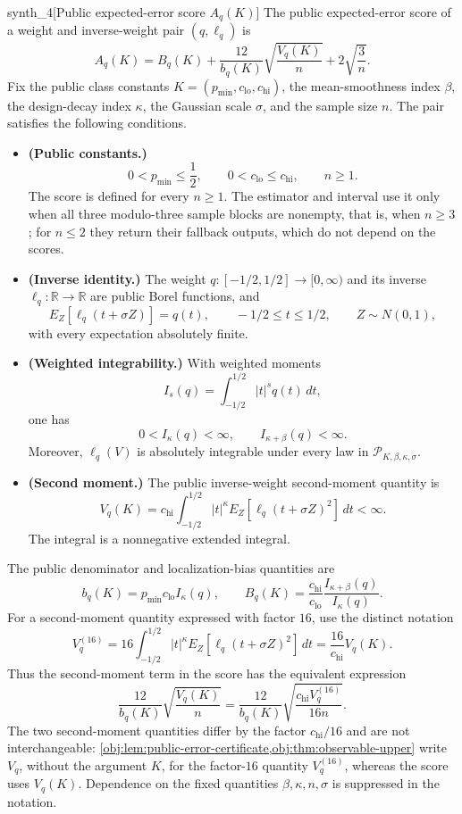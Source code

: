\documentclass[11pt]{article}
\begin{document}
\begin{definitionv}{synth_4}[Public expected-error score \(A_q(K)\)]
The public expected-error score of a weight and inverse-weight pair \((q,\ell_q)\) is
\[
A_q(K)
=
B_q(K)
+\frac{12}{b_q(K)}\sqrt{\frac{V_q(K)}{n}}
+2\sqrt{\frac3n}.
\]
Fix the public class constants \(K=(p_{\min},c_{\mathrm{lo}},c_{\mathrm{hi}})\), the mean-smoothness index \(\beta\), the design-decay index \(\kappa\), the Gaussian scale \(\sigma\), and the sample size \(n\). The pair satisfies the following conditions.
\begin{itemize}
\item \textbf{(Public constants.)}
\[
0<p_{\min}\le\frac12,
\qquad
0<c_{\mathrm{lo}}\le c_{\mathrm{hi}},
\qquad n\ge1.
\]
The score is defined for every \(n\ge1\). The estimator and interval use it only when all three modulo-three sample blocks are nonempty, that is, when \(n\ge3\); for \(n\le2\) they return their fallback outputs, which do not depend on the scores.
\item \textbf{(Inverse identity.)}
The weight \(q:[-1/2,1/2]\to[0,\infty)\) and its inverse \(\ell_q:\mathbb R\to\mathbb R\) are public Borel functions, and
\[
E_Z[\ell_q(t+\sigma Z)]=q(t),
\qquad -1/2\le t\le1/2,
\qquad Z\sim N(0,1),
\]
with every expectation absolutely finite.
\item \textbf{(Weighted integrability.)}
With weighted moments
\[
I_s(q)=\int_{-1/2}^{1/2}|t|^s q(t)\,dt,
\]
one has
\[
0<I_\kappa(q)<\infty,
\qquad
I_{\kappa+\beta}(q)<\infty.
\]
Moreover, \(\ell_q(V)\) is absolutely integrable under every law in \(\mathcal P_{K,\beta,\kappa,\sigma}\).
\item \textbf{(Second moment.)}
The public inverse-weight second-moment quantity is
\[
V_q(K)
=
c_{\mathrm{hi}}\int_{-1/2}^{1/2}
|t|^\kappa E_Z[\ell_q(t+\sigma Z)^2]\,dt
<\infty.
\]
The integral is a nonnegative extended integral.
\end{itemize}
The public denominator and localization-bias quantities are
\[
b_q(K)=p_{\min}c_{\mathrm{lo}}I_\kappa(q),
\qquad
B_q(K)=\frac{c_{\mathrm{hi}}}{c_{\mathrm{lo}}}
\frac{I_{\kappa+\beta}(q)}{I_\kappa(q)}.
\]
For a second-moment quantity expressed with factor \(16\), use the distinct notation
\[
V_q^{(16)}
=
16\int_{-1/2}^{1/2}|t|^\kappa
E_Z[\ell_q(t+\sigma Z)^2]\,dt
=
\frac{16}{c_{\mathrm{hi}}}V_q(K).
\]
Thus the second-moment term in the score has the equivalent expression
\[
\frac{12}{b_q(K)}\sqrt{\frac{V_q(K)}n}
=
\frac{12}{b_q(K)}
\sqrt{\frac{c_{\mathrm{hi}}V_q^{(16)}}{16n}}.
\]
The two second-moment quantities differ by the factor \(c_{\mathrm{hi}}/16\) and are not interchangeable: \cref{obj:lem:public-error-certificate,obj:thm:observable-upper} write \(V_q\), without the argument \(K\), for the factor-\(16\) quantity \(V_q^{(16)}\), whereas the score uses \(V_q(K)\).
Dependence on the fixed quantities \(\beta,\kappa,n,\sigma\) is suppressed in the notation.
\end{definitionv}
\end{document}
